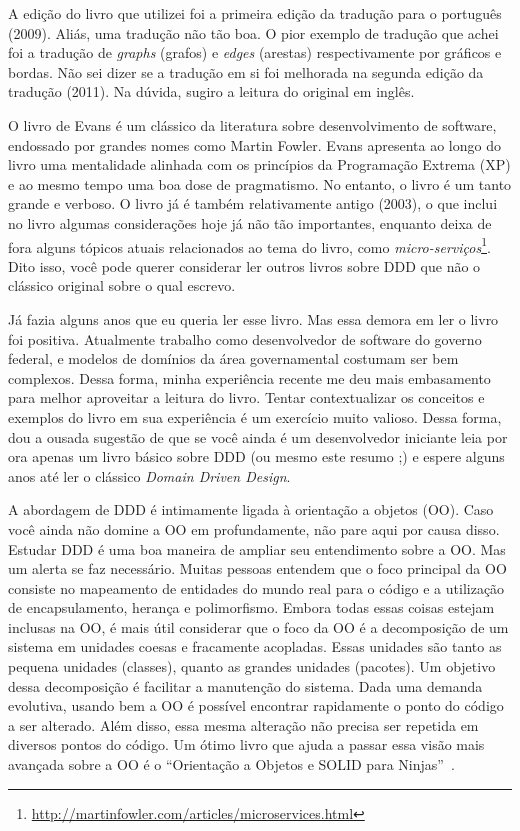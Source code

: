 \documentclass[a4paper, 12pt]{article}
\newcommand{\ddd}{\emph{Domain Driven Design}\xspace}
\begin{document}
A edição do livro que utilizei foi a primeira edição da tradução para o português (2009). Aliás, uma tradução não tão boa. O pior exemplo de tradução que achei foi a tradução de \emph{graphs} (grafos) e \emph{edges} (arestas) respectivamente por gráficos e bordas. Não sei dizer se a tradução em si foi melhorada na segunda edição da tradução (2011). Na dúvida, sugiro a leitura do original em inglês.

O livro de Evans é um clássico da literatura sobre desenvolvimento de software, endossado por grandes nomes como Martin Fowler. Evans apresenta ao longo do livro uma mentalidade alinhada com os princípios da Programação Extrema (XP) e ao mesmo tempo uma boa dose de pragmatismo. No entanto, o livro é um tanto grande e verboso. O livro já é também relativamente antigo (2003), o que inclui no livro algumas considerações hoje já não tão importantes, enquanto deixa de fora alguns tópicos atuais relacionados ao tema do livro, como \emph{micro-serviços}\footnote{\url{http://martinfowler.com/articles/microservices.html}}. Dito isso, você pode querer considerar ler outros livros sobre DDD que não o clássico original sobre o qual escrevo.

Já fazia alguns anos que eu queria ler esse livro. Mas essa demora em ler o livro foi positiva. Atualmente trabalho como desenvolvedor de software do governo federal, e modelos de domínios da área governamental costumam ser bem complexos. Dessa forma, minha experiência recente me deu mais embasamento para melhor aproveitar a leitura do livro. Tentar contextualizar os conceitos e exemplos do livro em sua experiência é um exercício muito valioso. Dessa forma, dou a ousada sugestão de que se você ainda é um desenvolvedor iniciante leia por ora apenas um livro básico sobre DDD (ou mesmo este resumo ;) e espere alguns anos até ler o clássico \ddd.

A abordagem de DDD é intimamente ligada à orientação a objetos (OO). Caso você ainda não domine a OO em profundamente, não pare aqui por causa disso. Estudar DDD é uma boa maneira de ampliar seu entendimento sobre a OO. Mas um alerta se faz necessário. Muitas pessoas entendem que o foco principal da OO consiste no mapeamento de entidades do mundo real para o código e a utilização de encapsulamento, herança e polimorfismo. Embora todas essas coisas estejam inclusas na OO, é mais útil considerar que o foco da OO é a decomposição de um sistema em unidades coesas e fracamente acopladas. Essas unidades são tanto as pequena unidades (classes), quanto as grandes unidades (pacotes). Um objetivo dessa decomposição é facilitar a manutenção do sistema. Dada uma demanda evolutiva, usando bem a OO é possível encontrar rapidamente o ponto do código a ser alterado. Além disso, essa mesma alteração não precisa ser repetida em diversos pontos do código. Um ótimo livro que ajuda a passar essa visão mais avançada sobre a OO é o ``Orientação a Objetos e SOLID para Ninjas''~\cite{Aniche2015Ninjas}.
\end{document}
